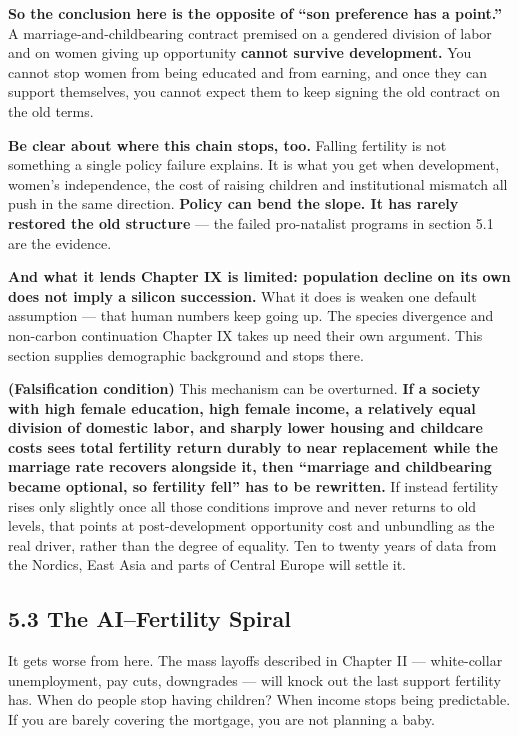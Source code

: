 \documentclass[11pt,a4paper]{article}
\begin{document}
\textbf{So the conclusion here is the opposite of ``son preference has a point.''} A marriage-and-childbearing contract premised on a gendered division of labor and on women giving up opportunity \textbf{cannot survive development.} You cannot stop women from being educated and from earning, and once they can support themselves, you cannot expect them to keep signing the old contract on the old terms.

\textbf{Be clear about where this chain stops, too.} Falling fertility is not something a single policy failure explains. It is what you get when development, women's independence, the cost of raising children and institutional mismatch all push in the same direction. \textbf{Policy can bend the slope. It has rarely restored the old structure} --- the failed pro-natalist programs in section 5.1 are the evidence.

\textbf{And what it lends Chapter IX is limited: population decline on its own does not imply a silicon succession.} What it does is weaken one default assumption --- that human numbers keep going up. The species divergence and non-carbon continuation Chapter IX takes up need their own argument. This section supplies demographic background and stops there.

\textbf{(Falsification condition)} This mechanism can be overturned. \textbf{If a society with high female education, high female income, a relatively equal division of domestic labor, and sharply lower housing and childcare costs sees total fertility return durably to near replacement while the marriage rate recovers alongside it, then ``marriage and childbearing became optional, so fertility fell'' has to be rewritten.} If instead fertility rises only slightly once all those conditions improve and never returns to old levels, that points at post-development opportunity cost and unbundling as the real driver, rather than the degree of equality. Ten to twenty years of data from the Nordics, East Asia and parts of Central Europe will settle it.

\subsection{5.3 The AI--Fertility Spiral}

It gets worse from here. The mass layoffs described in Chapter II --- white-collar unemployment, pay cuts, downgrades --- will knock out the last support fertility has. When do people stop having children? When income stops being predictable. If you are barely covering the mortgage, you are not planning a baby.
\end{document}
